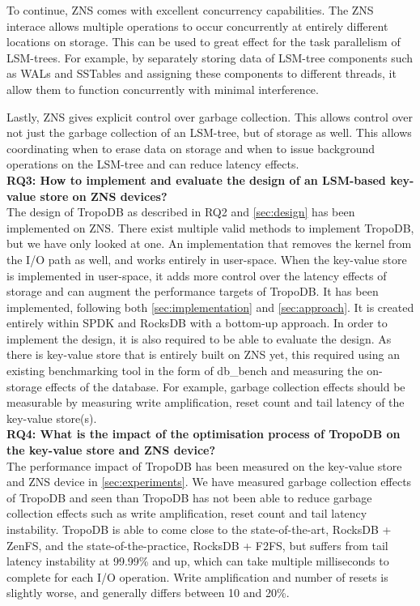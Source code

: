 To continue, ZNS comes with excellent concurrency capabilities. The ZNS interace allows multiple operations to occur concurrently at entirely different locations on storage. This can be used to great effect for the task parallelism of LSM-trees. For example, by separately storing data of LSM-tree components such as WALs and SSTables and assigning these components to different threads, it allow them to function concurrently with minimal interference.

Lastly, ZNS gives explicit control over garbage collection. This allows control over not just the garbage collection of an LSM-tree, but of storage as well. This allows coordinating when to erase data on storage and when to issue background operations on the LSM-tree and can reduce latency effects. 
\\
\textbf{RQ3: How to implement and evaluate the design of an LSM-based key-value store on ZNS devices?}\\
The design of TropoDB as described in RQ2 and \autoref{sec:design} has been implemented on ZNS. There exist multiple valid methods to implement TropoDB, but we have only looked at one. An implementation that removes the kernel from the I/O path as well, and works entirely in user-space. When the key-value store is implemented in user-space, it adds more control over the latency effects of storage and can augment the performance targets of TropoDB. It has been implemented, following both \autoref{sec:implementation} and \autoref{sec:approach}. It is created entirely within SPDK and RocksDB with a bottom-up approach. In order to implement the design, it is also required to be able to evaluate the design. As there is key-value store that is entirely built on ZNS yet, this required using an existing benchmarking tool in the form of db\_bench and measuring the on-storage effects of the database. For example, garbage collection effects should be measurable by measuring write amplification, reset count and tail latency of the key-value store(s).\\
\textbf{RQ4: What is the impact of the optimisation process of TropoDB on the key-value store and ZNS device?}\\
The performance impact of TropoDB has been measured on the key-value store and ZNS device in \autoref{sec:experiments}. We have measured garbage collection effects of TropoDB and seen than TropoDB has not been able to reduce garbage collection effects such as write amplification, reset count and tail latency instability. TropoDB is able to come close to the state-of-the-art, RocksDB + ZenFS, and the state-of-the-practice, RocksDB + F2FS, but suffers from tail latency instability at 99.99\% and up, which can take multiple milliseconds to complete for each I/O operation. Write amplification and number of resets is slightly worse, and generally differs between 10 and 20\%.

